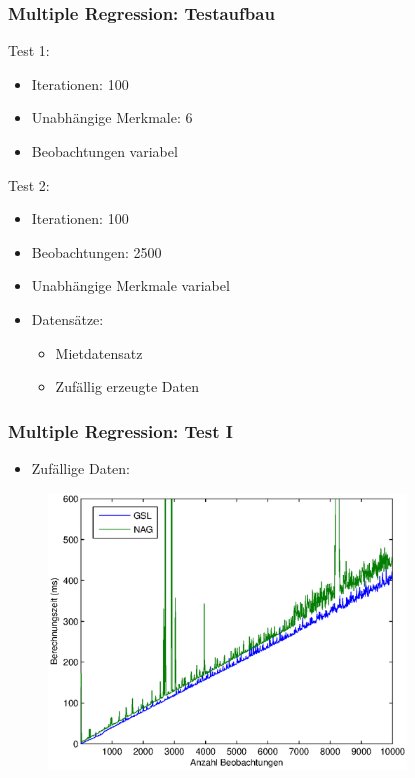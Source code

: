 \documentclass{beamer}
\begin{document}
\begin{frame}
  \frametitle{Multiple Regression: Testaufbau}
  
  \begin{block}{Test 1:}
    \begin{itemize}
    \item Iterationen: 100
    \item Unabhängige Merkmale: 6
    \item Beobachtungen variabel
    \end{itemize}
  \end{block}

  \begin{block}{Test 2:}
    \begin{itemize}
    \item Iterationen: 100
    \item Beobachtungen: 2500
    \item Unabhängige Merkmale variabel
    \end{itemize}
  \end{block}
  
  \begin{itemize}
  \item Datensätze:
    \begin{itemize}
    \item Mietdatensatz
    \item Zufällig erzeugte Daten
    \end{itemize}
  \end{itemize}
  
\end{frame}

\begin{frame}
  \frametitle{Multiple Regression: Test I}

  \begin{itemize}
  \item Zufällige Daten:
  \end{itemize}

  \begin{figure}[t]
    \centering
    \includegraphics[width=9.5cm]{figures/multi_reg_comp_6_var.eps}
  \end{figure}

\end{frame}
\end{document}
